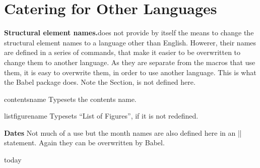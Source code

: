 \begin{teX}
\newcommand\@makefntext[1]{%
    \parindent 1em%
    \noindent
    \hb@xt@1.8em{\hss\@makefnmark}#1}
\end{teX}

\section{Catering for Other Languages}


\textbf{Structural element names.}\quad \latex does not provide by itself the means to change the structural element names to a language other than English. Howerer, their names are defined  in a series of commands, that make it easier to be overwritten to change them to another language. As they are separate from the macros that use them, it is easy to overwrite them, in order to use another language. This is what the Babel package does. Note the Section, is not defined here.

\begin{docCommand}{contentsname}{}
Typesets the contents name.
\end{docCommand}
\begin{teX}
\newcommand\contentsname{Contents}
\end{teX}

\begin{docCommand}{listfigurename}{}
Typesets \enquote{List of Figures}, if it is not redefined.
\end{docCommand}

\begin{teX}
\newcommand\listfigurename{List of Figures}
\newcommand\listtablename{List of Tables}
\newcommand\bibname{Bibliography}
\newcommand\indexname{Index}
\newcommand\figurename{Figure}
\newcommand\tablename{Table}
\newcommand\partname{Part}
\newcommand\chaptername{Chapter}
\newcommand\appendixname{Appendix}
\end{teX}

\textbf{Dates} Not much of a use but the month names are also defined here in an |\ifcase| statement. Again they can be overwritten by Babel.

\begin{docCommand}{today}{}
\end{docCommand}

\begin{teX}
\def\today{\ifcase\month\or
  January\or February\or March\or April\or May\or June\or
  July\or August\or September\or October\or November\or December\fi
  \space\number\day, \number\year}
\end{teX}

